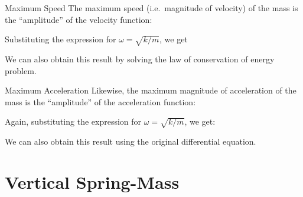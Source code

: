\documentclass[12pt,compress,aspectratio=169]{beamer}
\begin{document}
\begin{frame}{Maximum Speed}
  The maximum speed (i.e.\ magnitude of velocity) of the mass is the
  ``amplitude'' of the velocity function:


  \vspace{-.05in}Substituting the expression for $\omega=\sqrt{k/m}$, we get
  

  We can also obtain this result by solving the law of conservation of energy
  problem. 
\end{frame}



\begin{frame}{Maximum Acceleration}
  Likewise, the maximum magnitude of acceleration of the mass is the
  ``amplitude'' of the acceleration function:


  \vspace{-.05in}Again, substituting the expression for $\omega=\sqrt{k/m}$, we
  get:
  

  We can also obtain this result using the original differential equation.
\end{frame}



\section{Vertical Spring-Mass}
\end{document}
